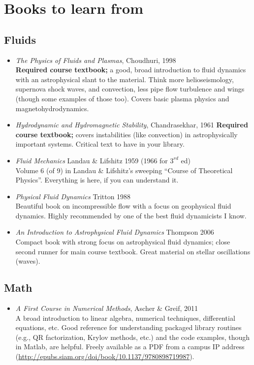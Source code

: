 \documentclass[12pt, preprint]{aastex}
\begin{document}
\section*{Books to learn from}

\subsection*{Fluids}
\begin{itemize}
\item \emph{The Physics of Fluids and Plasmas}, Choudhuri, 1998 \\
  \textbf{Required course textbook;} a good, broad introduction to fluid dynamics with an astrophysical slant to the material.  Think more helioseismology, supernova shock waves, and convection, less pipe flow turbulence and wings (though some examples of those too).  Covers basic plasma physics and magnetohydrodynamics.

\item \emph{Hydrodynamic and Hydromagnetic Stability}, Chandrasekhar, 1961
\textbf{Required course textbook;} covers instabilities (like convection) in astrophysically important systems.  Critical text to have in your library.
\\[0.5cm]

\item \emph{Fluid Mechanics} Landau \& Lifshitz 1959 (1966 for $3^{rd}$ ed)\\
  Volume 6 (of 9) in Landau \& Lifshitz's sweeping ``Course of Theoretical Physics''.
  Everything is here, if you can understand it.

\item \emph{Physical Fluid Dynamics} Tritton 1988 \\
Beautiful book on incompressible flow with a focus on geophysical
fluid dynamics.  Highly recommended by one of the best fluid
dynamicists I know.

\item \emph{An Introduction to Astrophysical Fluid Dynamics} Thompson 2006 \\
Compact book with strong focus on astrophysical fluid dynamics; close
second runner for main course textbook.  Great material on stellar
oscillations (waves).

\end{itemize}

\subsection*{Math}
\begin{itemize}
\item \emph{A First Course in Numerical Methods}, Ascher \& Greif, 2011 \\
  A broad introduction to linear algebra, numerical techniques,
  differential equations, etc.  Good reference for understanding
  packaged library routines (e.g., QR factorization, Krylov methods, etc.)
  and the code examples, though in Matlab, are helpful.  Freely
  available as a PDF from a campus IP address
  (\url{http://epubs.siam.org/doi/book/10.1137/9780898719987}).
\end{itemize}
\end{document}
